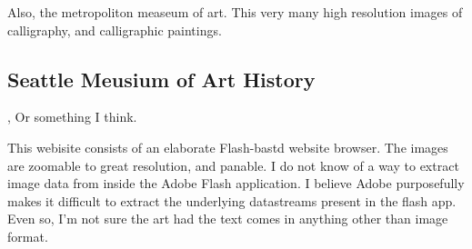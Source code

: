 Also, the metropoliton measeum of art.  This very many high resolution images of calligraphy, and calligraphic paintings.

\subsection{Seattle Meusium of Art History}, Or something I think.

This webisite consists of an elaborate Flash-bastd website browser.  The images are zoomable to great resolution, and panable.  I do not know of a way to extract image data from inside the Adobe Flash application.  I believe Adobe purposefully makes it difficult to extract the underlying datastreams present in the flash app.
Even so, I'm not sure the art had the text comes in anything other than image format.
